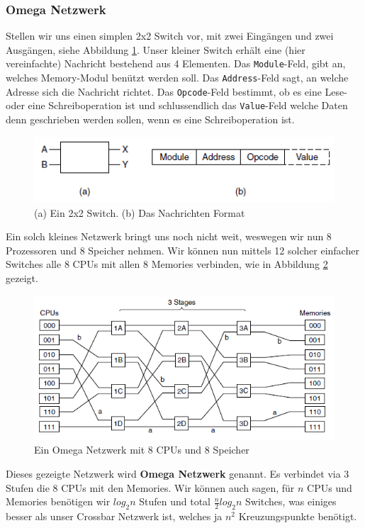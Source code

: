 \subsubsection{Omega Netzwerk}
Stellen wir uns einen simplen 2x2 Switch vor, mit zwei Eingängen und zwei Ausgängen, siehe Abbildung \ref{fig:omegaswitch}. Unser kleiner Switch erhält eine (hier vereinfachte) Nachricht bestehend aus 4 Elementen. Das \texttt{Module}-Feld, gibt an, welches Memory-Modul benützt werden soll. Das \texttt{Address}-Feld sagt, an welche Adresse sich die Nachricht richtet. Das \texttt{Opcode}-Feld bestimmt, ob es eine Lese- oder eine Schreiboperation ist und schlussendlich das \texttt{Value}-Feld welche Daten denn geschrieben werden sollen, wenn es eine Schreiboperation ist.
\begin{figure}[h]
\centering
\includegraphics[width=0.7\linewidth]{fig/omega_switch}
\caption{(a) Ein 2x2 Switch. (b) Das Nachrichten Format}
\label{fig:omegaswitch}
\end{figure}

Ein solch kleines Netzwerk bringt uns noch nicht weit, weswegen wir nun 8 Prozessoren und 8 Speicher nehmen. Wir können nun mittels 12 solcher einfacher Switches alle 8 CPUs mit allen 8 Memories verbinden, wie in Abbildung \ref{fig:omega_gross} gezeigt.
\begin{figure}[h]
\centering
\includegraphics[width=0.7\linewidth]{fig/omega_gross}
\caption{Ein Omega Netzwerk mit 8 CPUs und 8 Speicher}
\label{fig:omega_gross}
\end{figure}
Dieses gezeigte Netzwerk wird \textbf{Omega Netzwerk} genannt. Es verbindet via 3 Stufen die 8 CPUs mit den Memories. Wir können auch sagen, für $ n $ CPUs und Memories benötigen wir $ log_{2} n $ Stufen und total $ \frac{n}{2} log_{2}n $ Switches, was einiges besser als unser Crossbar Netzwerk ist, welches ja $ n^{2} $ Kreuzungspunkte benötigt.

